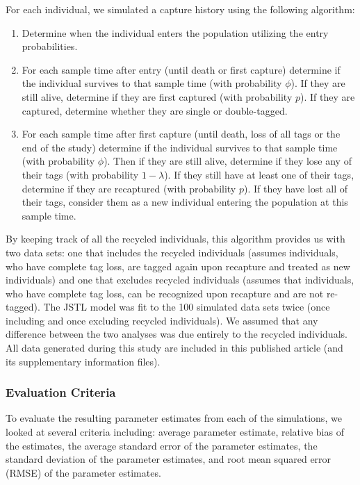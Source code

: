 \documentclass[12pt]{article}
\begin{document}
For each individual, we simulated a capture history using the following
algorithm:

\begin{enumerate}
\def\labelenumi{\arabic{enumi}.}
\item
  Determine when the individual enters the population utilizing the
  entry probabilities.
\item
  For each sample time after entry (until death or first capture) 
  determine if the individual survives to that sample time (with
  probability \(\phi\)). If they are still alive, determine if they are
  first captured (with probability \(p\)). If they are captured,
  determine whether they are single or double-tagged.
\item
  For each sample time after first capture (until death, loss of all
  tags or the end of the study) determine if the individual survives to
  that sample time (with probability \(\phi\)). Then if they are still
  alive, determine if they lose any of their tags (with probability
  \(1-\lambda\)). If they still have at least one of their tags,
  determine if they are recaptured (with probability \(p\)). If they
  have lost all of their tags, consider them as a new individual
  entering the population at this sample time.
\end{enumerate}

By keeping track of all the recycled individuals, this algorithm 
provides us with two data sets: one that includes the recycled
individuals (assumes individuals, who have complete tag loss, are tagged
again upon recapture and treated as new individuals) and one that
excludes recycled individuals (assumes that individuals, who
have complete tag loss, can be recognized upon recapture and are not
re-tagged). The JSTL model was fit to the 100 simulated data sets twice
(once including and once excluding recycled individuals). We assumed that any
difference between the two analyses was due entirely to the recycled
individuals. All data generated during this study are included in this published article (and its supplementary information files).

\subsubsection{Evaluation Criteria}\label{evaluation-criteria}

To evaluate the resulting parameter estimates from each of the simulations, we looked at several criteria including: average parameter
estimate, relative bias of the estimates, the average standard error of
the parameter estimates, the standard deviation of the parameter
estimates, and root mean squared error (RMSE) of the parameter
estimates.
\end{document}
